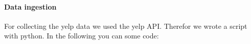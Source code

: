 \paragraph{Data ingestion}
\label{subsec:Data ingestion}
For collecting the yelp data we used the yelp API. Therefor we wrote a script with python. In the following you can some code:
